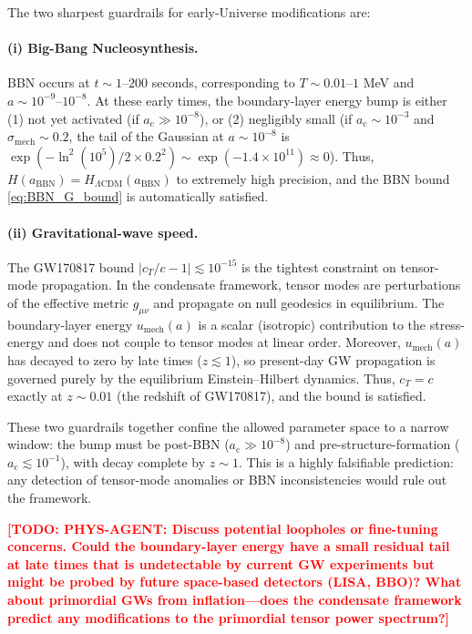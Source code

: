 \documentclass[11pt,a4paper]{article}
\newcommand{\ac}{a_{\mathrm{c}}}
\newcommand{\sigmamech}{\sigma_{\mathrm{mech}}}
\newcommand{\umech}{u_{\mathrm{mech}}}
\theoremstyle{definition}
\newcommand{\TODO}[1]{\textcolor{red}{\textbf{[TODO: #1]}}}
\begin{document}
The two sharpest guardrails for early-Universe modifications are:

\paragraph{(i) Big-Bang Nucleosynthesis.}
BBN occurs at $t \sim 1$--$200$ seconds, corresponding to $T \sim 0.01$--$1$ MeV and $a \sim 10^{-9}$--$10^{-8}$. At these early times, the boundary-layer energy bump is either (1) not yet activated (if $\ac \gg 10^{-8}$), or (2) negligibly small (if $\ac \sim 10^{-3}$ and $\sigmamech \sim 0.2$, the tail of the Gaussian at $a \sim 10^{-8}$ is $\exp(-\ln^2(10^5)/2 \times 0.2^2) \sim \exp(-1.4 \times 10^{11}) \approx 0$). Thus, $H(a_{\mathrm{BBN}}) = H_{\Lambda\mathrm{CDM}}(a_{\mathrm{BBN}})$ to extremely high precision, and the BBN bound \eqref{eq:BBN_G_bound} is automatically satisfied.

\paragraph{(ii) Gravitational-wave speed.}
The GW170817 bound $|c_T/c - 1| \lesssim 10^{-15}$ is the tightest constraint on tensor-mode propagation. In the condensate framework, tensor modes are perturbations of the effective metric $g_{\mu\nu}$ and propagate on null geodesics in equilibrium. The boundary-layer energy $\umech(a)$ is a scalar (isotropic) contribution to the stress-energy and does not couple to tensor modes at linear order. Moreover, $\umech(a)$ has decayed to zero by late times ($z \lesssim 1$), so present-day GW propagation is governed purely by the equilibrium Einstein--Hilbert dynamics. Thus, $c_T = c$ exactly at $z \sim 0.01$ (the redshift of GW170817), and the bound is satisfied.

These two guardrails together confine the allowed parameter space to a narrow window: the bump must be post-BBN ($\ac \gg 10^{-8}$) and pre-structure-formation ($\ac \lesssim 10^{-1}$), with decay complete by $z \sim 1$. This is a highly falsifiable prediction: any detection of tensor-mode anomalies or BBN inconsistencies would rule out the framework.

\TODO{PHYS-AGENT: Discuss potential loopholes or fine-tuning concerns. Could the boundary-layer energy have a small residual tail at late times that is undetectable by current GW experiments but might be probed by future space-based detectors (LISA, BBO)? What about primordial GWs from inflation---does the condensate framework predict any modifications to the primordial tensor power spectrum?}
\end{document}
